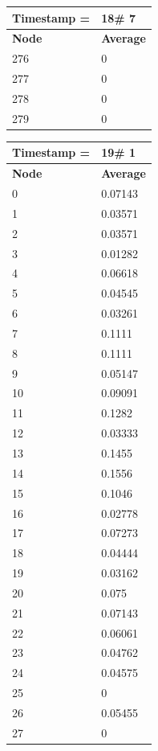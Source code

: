 \begin{tabular}{|l||l|}
\hline
\textbf{Timestamp =} & \textbf{18}\# 7\\\hline
	\textbf{Node} & \textbf{Average} \\ \hline
\hline
	276 & 0 \\ \hline
	277 & 0 \\ \hline
	278 & 0 \\ \hline
	279 & 0 \\ \hline
\end{tabular}

\begin{tabular}{|l||l|}
\hline
\textbf{Timestamp =} & \textbf{19}\# 1\\\hline
	\textbf{Node} & \textbf{Average} \\ \hline
\hline
	0 & 0.07143 \\ \hline
	1 & 0.03571 \\ \hline
	2 & 0.03571 \\ \hline
	3 & 0.01282 \\ \hline
	4 & 0.06618 \\ \hline
	5 & 0.04545 \\ \hline
	6 & 0.03261 \\ \hline
	7 & 0.1111 \\ \hline
	8 & 0.1111 \\ \hline
	9 & 0.05147 \\ \hline
	10 & 0.09091 \\ \hline
	11 & 0.1282 \\ \hline
	12 & 0.03333 \\ \hline
	13 & 0.1455 \\ \hline
	14 & 0.1556 \\ \hline
	15 & 0.1046 \\ \hline
	16 & 0.02778 \\ \hline
	17 & 0.07273 \\ \hline
	18 & 0.04444 \\ \hline
	19 & 0.03162 \\ \hline
	20 & 0.075 \\ \hline
	21 & 0.07143 \\ \hline
	22 & 0.06061 \\ \hline
	23 & 0.04762 \\ \hline
	24 & 0.04575 \\ \hline
	25 & 0 \\ \hline
	26 & 0.05455 \\ \hline
	27 & 0 \\ \hline

\end{tabular}
